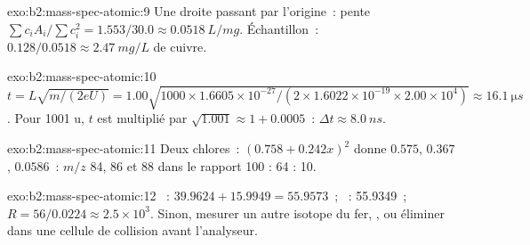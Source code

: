 \begin{solution}{exo:b2:mass-spec-atomic:9}
Une droite passant par l'origine~: pente $\sum c_iA_i/\sum c_i^2 = 1.553/30.0 \approx \qty{0.0518}{L/mg}$.
Échantillon~:
$0.128/0.0518 \approx \qty{2.47}{mg/L}$ de cuivre.
\end{solution}

\begin{solution}{exo:b2:mass-spec-atomic:10}
$t = L\sqrt{m/(2eU)} = 1.00\sqrt{1000 \times 1.6605 \times 10^{-27}/(2 \times 1.6022 \times 10^{-19}
\times 2.00 \times 10^4)} \approx \qty{16.1}{\micro s}$. Pour 1001 u, $t$ est multiplié par
$\sqrt{1.001} \approx 1 + 0.0005$~: $\Delta t \approx \qty{8.0}{ns}$.
\end{solution}

\begin{solution}{exo:b2:mass-spec-atomic:11}
Deux chlores~: $(0.758 + 0.242x)^2$ donne $0.575$, $0.367$, $0.0586$~: $m/z$ 84, 86 et 88 dans le rapport
100 : 64 : 10.
\end{solution}

\begin{solution}{exo:b2:mass-spec-atomic:12}
~: $39.9624 + 15.9949 = 55.9573$~; ~: 55.9349~; $R = 56/0.0224 \approx 2.5 \times
10^3$. Sinon, mesurer un autre isotope du fer, , ou éliminer  dans une cellule de
collision avant l'analyseur.
\end{solution}

